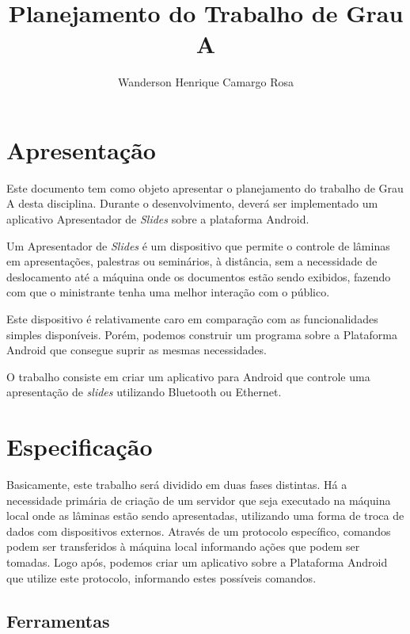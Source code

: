 \documentclass{article}
\title{Planejamento do Trabalho de Grau A}
\author{Wanderson Henrique Camargo Rosa\inst{1}}
\begin{document}
\maketitle{}

\section{Apresentação}
\label{sec:apresentacao}

Este documento tem como objeto apresentar o planejamento do trabalho de Grau A
desta disciplina. Durante o desenvolvimento, deverá ser implementado um
aplicativo Apresentador de \emph{Slides} sobre a plataforma Android.

Um Apresentador de \emph{Slides} é um dispositivo que permite o controle de
lâminas em apresentações, palestras ou seminários, à distância, sem a
necessidade de deslocamento até a máquina onde os documentos estão sendo
exibidos, fazendo com que o ministrante tenha uma melhor interação com o
público.

Este dispositivo é relativamente caro em comparação com as funcionalidades
simples disponíveis. Porém, podemos construir um programa sobre a Plataforma
Android que consegue suprir as mesmas necessidades.

O trabalho consiste em criar um aplicativo para Android que controle uma
apresentação de \emph{slides} utilizando Bluetooth ou Ethernet.

\section{Especificação}
\label{sec:especificacao}

Basicamente, este trabalho será dividido em duas fases distintas. Há a
necessidade primária de criação de um servidor que seja executado na
máquina local onde as lâminas estão sendo apresentadas, utilizando uma forma de
troca de dados com dispositivos externos. Através de um protocolo específico,
comandos podem ser transferidos à máquina local informando ações que podem ser
tomadas. Logo após, podemos criar um aplicativo sobre a Plataforma Android que
utilize este protocolo, informando estes possíveis comandos.

\subsection{Ferramentas}
\end{document}
